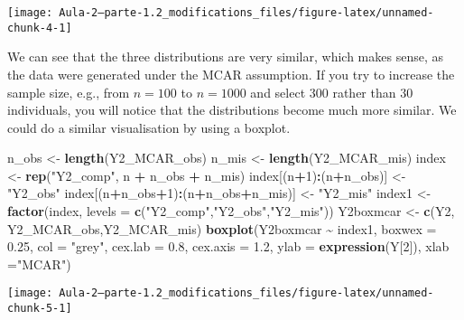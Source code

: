 \documentclass[
]{article}
\newenvironment{Shaded}{\begin{snugshade}}{\end{snugshade}}
\newcommand{\AttributeTok}[1]{\textcolor[rgb]{0.13,0.29,0.53}{#1}}
\newcommand{\DecValTok}[1]{\textcolor[rgb]{0.00,0.00,0.81}{#1}}
\newcommand{\FloatTok}[1]{\textcolor[rgb]{0.00,0.00,0.81}{#1}}
\newcommand{\FunctionTok}[1]{\textcolor[rgb]{0.13,0.29,0.53}{\textbf{#1}}}
\newcommand{\NormalTok}[1]{#1}
\newcommand{\OtherTok}[1]{\textcolor[rgb]{0.56,0.35,0.01}{#1}}
\newcommand{\SpecialCharTok}[1]{\textcolor[rgb]{0.81,0.36,0.00}{\textbf{#1}}}
\newcommand{\StringTok}[1]{\textcolor[rgb]{0.31,0.60,0.02}{#1}}
\begin{document}
\begin{center}\texttt{[image: Aula-2---parte-1.2\_modifications\_files/figure-latex/unnamed-chunk-4-1]} \end{center}

We can see that the three distributions are very similar, which makes
sense, as the data were generated under the MCAR assumption. If you try
to increase the sample size, e.g., from \(n=100\) to \(n=1000\) and
select \(300\) rather than \(30\) individuals, you will notice that the
distributions become much more similar. We could do a similar
visualisation by using a boxplot.

\begin{Shaded}
\begin{Highlighting}[]
\NormalTok{n\_obs }\OtherTok{\textless{}{-}} \FunctionTok{length}\NormalTok{(Y2\_MCAR\_obs)}
\NormalTok{n\_mis }\OtherTok{\textless{}{-}} \FunctionTok{length}\NormalTok{(Y2\_MCAR\_mis)}
\NormalTok{index }\OtherTok{\textless{}{-}} \FunctionTok{rep}\NormalTok{(}\StringTok{"Y2\_comp"}\NormalTok{, n }\SpecialCharTok{+}\NormalTok{ n\_obs }\SpecialCharTok{+}\NormalTok{ n\_mis)}
\NormalTok{index[(n}\SpecialCharTok{+}\DecValTok{1}\NormalTok{)}\SpecialCharTok{:}\NormalTok{(n}\SpecialCharTok{+}\NormalTok{n\_obs)] }\OtherTok{\textless{}{-}} \StringTok{"Y2\_obs"}
\NormalTok{index[(n}\SpecialCharTok{+}\NormalTok{n\_obs}\SpecialCharTok{+}\DecValTok{1}\NormalTok{)}\SpecialCharTok{:}\NormalTok{(n}\SpecialCharTok{+}\NormalTok{n\_obs}\SpecialCharTok{+}\NormalTok{n\_mis)] }\OtherTok{\textless{}{-}} \StringTok{"Y2\_mis"}
\NormalTok{index1 }\OtherTok{\textless{}{-}} \FunctionTok{factor}\NormalTok{(index, }\AttributeTok{levels =} \FunctionTok{c}\NormalTok{(}\StringTok{"Y2\_comp"}\NormalTok{,}\StringTok{"Y2\_obs"}\NormalTok{,}\StringTok{"Y2\_mis"}\NormalTok{))}
\NormalTok{Y2boxmcar }\OtherTok{\textless{}{-}} \FunctionTok{c}\NormalTok{(Y2, Y2\_MCAR\_obs,Y2\_MCAR\_mis)}
\FunctionTok{boxplot}\NormalTok{(Y2boxmcar }\SpecialCharTok{\textasciitilde{}}\NormalTok{ index1, }\AttributeTok{boxwex =} \FloatTok{0.25}\NormalTok{, }\AttributeTok{col =} \StringTok{"grey"}\NormalTok{, }\AttributeTok{cex.lab =} \FloatTok{0.8}\NormalTok{, }
        \AttributeTok{cex.axis =} \FloatTok{1.2}\NormalTok{, }\AttributeTok{ylab =} \FunctionTok{expression}\NormalTok{(Y[}\DecValTok{2}\NormalTok{]), }\AttributeTok{xlab =}\StringTok{"MCAR"}\NormalTok{)}
\end{Highlighting}
\end{Shaded}

\begin{center}\texttt{[image: Aula-2---parte-1.2\_modifications\_files/figure-latex/unnamed-chunk-5-1]} \end{center}
\end{document}
